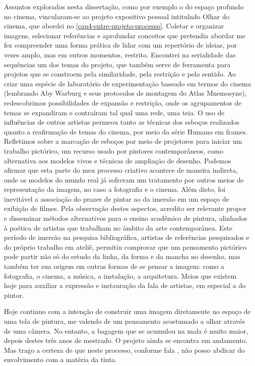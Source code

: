 Assuntos explorados nesta dissertação, como por exemplo o do espaço
profundo no cinema, vincularam-se ao projeto expositivo pessoal
intitulado Olhar do cinema, que abordei no \cref{cap4-entre-projeto-processo}. Coletar e
organizar imagens, selecionar referências e aprofundar conceitos que
pretendia abordar me fez compreender uma forma prática de lidar com um
repertório de ideias, por vezes amplo, mas em outros momentos,
restrito. Encontrei na serialidade das sequências um dos temas do
projeto, que também serve de ferramenta para projetos que se constroem
pela similaridade, pela restrição e pelo sentido. Ao criar uma espécie
de laboratório de experimentação baseado em termos do cinema (lembrando
Aby Warburg e seus protocolos de montagem do Atlas Mnemosyne),
redescobrimos possibilidades de expansão e restrição, onde os
agrupamentos de temas se expandiram e contraíram tal qual uma rede, uma
teia. O uso de influências de outros artistas permeou tanto as técnicas
dos esboços realizados quanto a reafirmação de temas do cinema, por
meio da série Humano em frames. Refletimos sobre a marcação de esboços
por meio de projetores para iniciar um trabalho pictórico, um recurso
usado por pintores contemporâneos, como alternativa aos modelos vivos e
técnicas de ampliação de desenho. Podemos afirmar que esta parte do meu
processo criativo acontece de maneira indireta, onde os modelos do
mundo real já sofreram um tratamento por outros meios de representação
da imagem, no caso a fotografia e o cinema. Além disto, foi inevitável
a associação do prazer de pintar ao da imersão em um espaço de exibição
de filmes. Pela observação destes aspectos, acredito ser relevante
propor e disseminar métodos alternativos para o ensino acadêmico de
pintura, alinhados à poética de artistas que trabalham no âmbito da
arte contemporânea. Este período de imersão na pesquisa bibliográfica,
artistas de referências pesquisados e do próprio trabalho em ateliê,
permitiu comprovar que um pensamento pictórico pode partir não só do
estudo da linha, da forma e da mancha no desenho, mas também ter sua
origem em outras formas de se pensar a imagem: como a fotografia, o
cinema, a música, a instalação, a arquitetura. Meios que existem hoje
para auxiliar a expressão e instauração da fala de artistas, em
especial a do pintor.

Hoje continuo com a intenção de construir uma imagem diretamente no
espaço de uma tela de pintura, me valendo de um pensamento acostumado a
olhar através de uma câmera. No entanto, a bagagem que se acumulou na
mala é muito maior, depois destes três anos de mestrado. O projeto
ainda se encontra em andamento. Mas trago a certeza de que neste
processo, conforme fala
\parencite{sabino2015pintura}, não posso abdicar do envolvimento com a
matéria da tinta.


\printbibliography[title=Referências]
